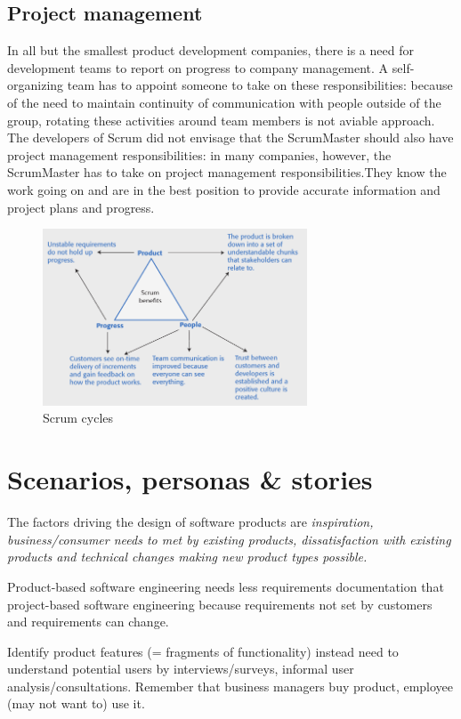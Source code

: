 \documentclass[10pt,a4paper]{report}
\begin{document}
\section{Project management}
In all but the smallest product development companies, there is a need for development teams to report on progress to company management.
A self-organizing team has to appoint someone to take on these responsibilities: because of the need to maintain continuity of communication with people outside of the group, rotating these activities around team members is not aviable approach.
The developers of Scrum did not envisage that the ScrumMaster should also have project management responsibilities: in many companies, however, the ScrumMaster has to take on project
management responsibilities.They know the work going on and are in the best position to provide accurate
information and project plans and progress.
\begin{figure}[h]
	\centering
	\includegraphics[width=0.7\textwidth]{image15}
	\caption{Scrum cycles}
	\label{image15}
\end{figure}

\chapter{Scenarios, personas \& stories}
The factors driving the design of software products are \textit{inspiration, business/consumer needs to met by existing products, dissatisfaction with existing products and technical changes making new product types possible.}

Product-based software engineering needs less requirements documentation that project-based software engineering because requirements not set by customers
and requirements can change.

Identify product features (= fragments of functionality) instead need to understand potential users by interviews/surveys, informal user analysis/consultations. Remember that business managers buy product, employee (may not
want to) use it. 
\end{document}
